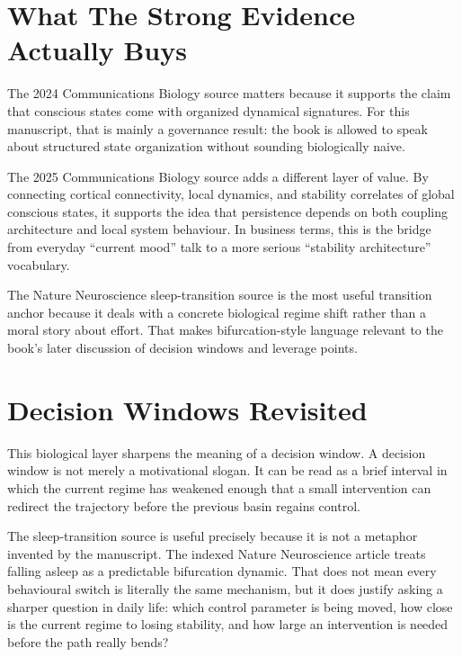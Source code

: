 \section{What The Strong Evidence Actually Buys}

The 2024 Communications Biology source matters because it supports the claim
that conscious states come with organized dynamical signatures. For this
manuscript, that is mainly a governance result: the book is allowed to speak
about structured state organization without sounding biologically naive.

The 2025 Communications Biology source adds a different layer of value. By
connecting cortical connectivity, local dynamics, and stability correlates of
global conscious states, it supports the idea that persistence depends on both
coupling architecture and local system behaviour. In business terms, this is
the bridge from everyday ``current mood'' talk to a more serious ``stability
architecture'' vocabulary.

The Nature Neuroscience sleep-transition source is the most useful transition
anchor because it deals with a concrete biological regime shift rather than a
moral story about effort. That makes bifurcation-style language relevant to the
book's later discussion of decision windows and leverage points.

\section{Decision Windows Revisited}

This biological layer sharpens the meaning of a decision window. A decision
window is not merely a motivational slogan. It can be read as a brief interval
in which the current regime has weakened enough that a small intervention can
redirect the trajectory before the previous basin regains control.

\begin{example}
The sleep-transition source is useful precisely because it is not a metaphor
invented by the manuscript. The indexed Nature Neuroscience article treats
falling asleep as a predictable bifurcation dynamic. That does not mean every
behavioural switch is literally the same mechanism, but it does justify asking
a sharper question in daily life: which control parameter is being moved, how
close is the current regime to losing stability, and how large an intervention
is needed before the path really bends?
\end{example}

